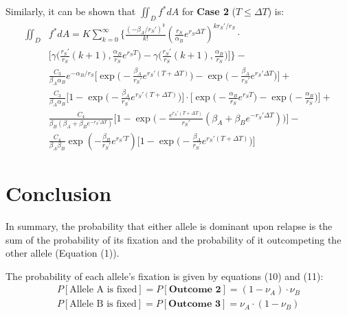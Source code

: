 \documentclass{article}
\begin{document}
Similarly, it can be shown that $\iint_D f^* dA$ for \textbf{Case 2} ($T \leq \Delta T$) is:
\begin{equation}
\begin{split}
\iint_D & f^* dA = K \sum_{k=0}^{\infty} \Bigg\{\frac{(-\beta_A/r_S')^k}{k!} (\frac{r_S}{\alpha_B}e^{r_S \Delta T})^{k r_S'/r_S} \cdot \\
& \Big[\gamma\big(\frac{r_S'}{r_S}(k+1),\frac{\alpha_B}{r_S} e^{r_S T}\big) - \gamma\big(\frac{r_S'}{r_S}(k+1),\frac{\alpha_B}{r_S}\big)\Big]\Bigg\} - \\
&\frac{C_3}{\beta_A \alpha_B} e^{-\alpha_B/r_S} \Big[\exp\Big(-\frac{\beta_A}{r_S'} e^{r_S'(T+\Delta T)}\Big) - \exp\Big(-\frac{\beta_A}{r_S'} e^{r_S' \Delta T}\Big)\Big] +\\ 
&\frac{C_3}{\beta_A \alpha_B}\Big[1 - \exp\Big(-\frac{\beta_A}{r_S'} e^{r_S' (T+\Delta T)}\Big)\Big]\cdot\Big[\exp\Big(-\frac{\alpha_B}{r_S} e^{r_S T}\Big) - \exp\Big(-\frac{\alpha_B}{r_S}\Big)\Big]+\\ 
&\frac{C_4}{\beta_B(\beta_A+\beta_B e^{-r_S' \Delta T})}\Big[1 - \exp\Big(-\frac{e^{r_S'(T+\Delta T)}}{r_S'} (\beta_A + \beta_B e^{-r_S' \Delta T})\Big)\Big] - \\ 
&\frac{C_4}{\beta_A \beta_B} \exp(-\frac{\beta_B}{r_S'} e^{r_S' T})\Big[1 - \exp\Big(-\frac{\beta_A}{r_S'} e^{r_S'(T + \Delta T)}\Big)\Big]
\end{split}
\end{equation}

\section{Conclusion}

In summary, the probability that either allele is dominant upon relapse is the sum of the probability of its fixation and the probability of it outcompeting the other allele (Equation (1)).

The probability of each allele's fixation is given by equations (10) and (11):
\begin{equation}
\begin{split}
P[\text{Allele A is fixed}] = P[\textbf{Outcome 2}] = (1 - \nu_A)\cdot\nu_B \\
P[\text{Allele B is fixed}] = P[\textbf{Outcome 3}] = \nu_A \cdot (1 - \nu_B)
\end{split}
\end{equation}
\end{document}
